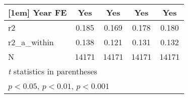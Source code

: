 {\begin{tabular}{l*{4}{c}}
[1em]
Year FE     &         Yes         &         Yes         &         Yes         &         Yes         \\
\hline
r2          &       0.185         &       0.169         &       0.178         &       0.180         \\
r2\_a\_within &       0.138         &       0.121         &       0.131         &       0.132         \\
N           &       14171         &       14171         &       14171         &       14171         \\
\hline\hline
\multicolumn{5}{l}{\footnotesize \textit{t} statistics in parentheses}\\
\multicolumn{5}{l}{\footnotesize \sym{*} \(p<0.05\), \sym{**} \(p<0.01\), \sym{***} \(p<0.001\)}\\
\end{tabular}
}
